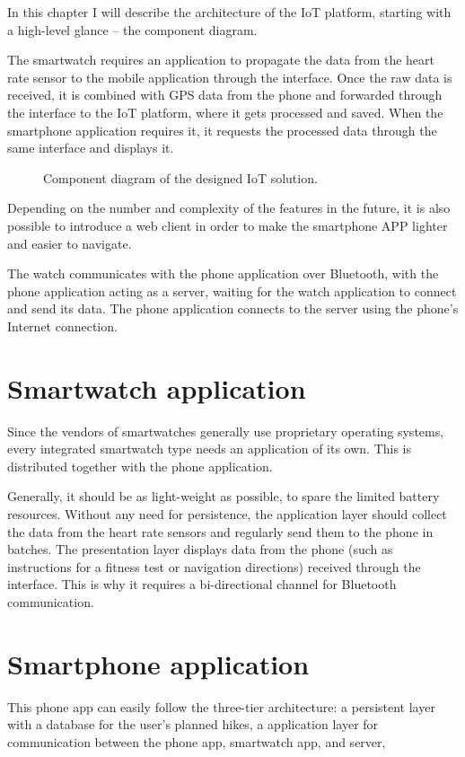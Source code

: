 In this chapter I will describe the architecture of the IoT platform, starting with a high-level glance -- the component diagram.

The smartwatch requires an application to propagate the data from the heart rate sensor to the mobile application through the  interface.
Once the raw data is received, it is combined with GPS data from the phone and forwarded through the  interface to the IoT platform, where it gets processed and saved.
When the smartphone application requires it, it requests the processed data through the same interface and displays it.

\begin{figure}[h]
    \caption{Component diagram of the designed IoT solution.}
\end{figure}

Depending on the number and complexity of the features in the future, it is also possible to introduce a web client in order to make the smartphone APP lighter and easier to navigate.

The watch communicates with the phone application over Bluetooth, with the phone application acting as a server, waiting for the watch application to connect and send its data.
The phone application connects to the server using the phone's Internet connection.

\section{Smartwatch application}
Since the vendors of smartwatches generally use proprietary operating systems, every integrated smartwatch type needs an application of its own.
This is distributed together with the phone application.

Generally, it should be as light-weight as possible, to spare the limited battery resources.
Without any need for persistence, the application layer should collect the data from the heart rate sensors and regularly send them to the phone in batches.
The presentation layer displays data from the phone (such as instructions for a fitness test or navigation directions) received through the  interface.
This is why it requires a bi-directional channel for Bluetooth communication.

\section{Smartphone application}
This phone app can easily follow the three-tier architecture: a persistent layer with a database for the user's planned hikes, a application layer for communication between the phone app, smartwatch app, and server, 


